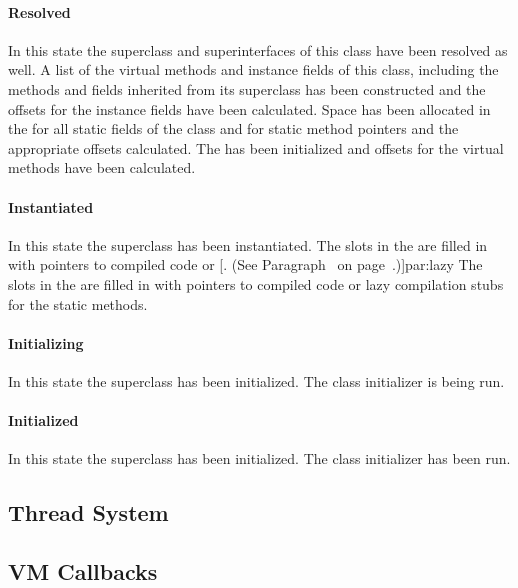 \paragraph{Resolved}
In this state the superclass and superinterfaces of this class have
been resolved as well.  A list of the virtual methods and instance fields
of this class, including the methods and fields inherited from its
superclass has been constructed and the offsets for the instance
fields have been calculated.  Space has been allocated in the  for
all static fields of the class and for static method pointers and the
appropriate offsets calculated.  The  has been initialized and
offsets for the virtual methods have been calculated.

\paragraph{Instantiated}
In this state the superclass has been instantiated.  The
slots in the  are filled in with pointers to compiled code or [.  (See Paragraph~\Ref{} on page~\Pageref.)]{par:lazy}  The slots in the  are filled in with
pointers to compiled code or lazy compilation stubs for the static methods.

\paragraph{Initializing} 
In this state the superclass has been initialized. The class
initializer is being run. 

\paragraph{Initialized} 
In this state the superclass has been initialized.  The class initializer has 
been run. 

\subsection{Thread System}\label{sec:threads}



\subsection{VM Callbacks}\label{sssec:callbacks}



